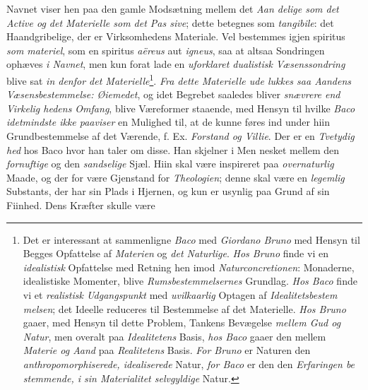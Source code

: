 Navnet viser hen paa den gamle Modsætning mellem det \emph{Aan\-%
delige som det Active og det Materielle som det Pas\-%
sive}; dette betegnes som \emph{tangibile}: det Haandgribelige, der
er Virksomhedens Materiale. Vel bestemmes igjen spiritus
\emph{som materiel}, som en spiritus \emph{aëreus} aut \emph{igneus}, saa at
altsaa Sondringen ophæves \emph{i Navnet}, men kun forat lade en
\emph{uforklaret dualistisk Væsenssondring} blive sat \emph{in\-%
denfor det Materielle}\footnote{Det er interessant at sammenligne \emph{Baco} med \emph{Giordano Bruno}
med Hensyn til Begges Opfattelse af \emph{Materien} og \emph{det Naturlige}.
\emph{Hos Bruno} finde vi en \emph{idealistisk} Opfattelse med Retning hen\-%
imod \emph{Naturconcretionen}: Monaderne, idealistiske Momenter, blive
\emph{Rumsbestemmelsernes} Grundlag. \emph{Hos Baco} finde vi et \emph{realistisk
Udgangspunkt} med \emph{uvilkaarlig} Optagen af \emph{Idealitetsbestem\-%
melsen}; det Ideelle reduceres til Bestemmelse af det Materielle.
\emph{Hos Bruno} gaaer, med Hensyn til dette Problem, Tankens Bevægelse
\emph{mellem Gud og Natur}, men overalt paa \emph{Idealitetens} Basis,
\emph{hos Baco} gaaer den mellem \emph{Materie og Aand} paa \emph{Realitetens}
Basis. \emph{For Bruno} er Naturen den \emph{anthropomorphiserede,
idealiserede} Natur, \emph{for Baco} er den den \emph{Erfaringen be\-%
stemmende, i sin Materialitet selvgyldige} Natur.}. \emph{Fra dette Materielle ude\-%
lukkes saa Aandens Væsensbestemmelse: Øiemedet},
og idet Begrebet saaledes bliver \emph{snævrere end Virkelig\-%
hedens Omfang}, blive Væreformer staaende, med Hensyn
til hvilke \emph{Baco idetmindste ikke paaviser} en Mulighed til,
at de kunne føres ind under hiin Grundbestemmelse af det
Værende, f. Ex. \emph{Forstand og Villie}. Der er en \emph{Tvetydig\-%
hed} hos Baco hvor han taler om disse. Han skjelner i Men\-%
nesket mellem den \emph{fornuftige} og den \emph{sandselige} Sjæl.
Hiin skal være inspireret paa \emph{overnaturlig} Maade, og der\-%
for være Gjenstand for \emph{Theologien}; denne skal være en
\emph{legemlig} Substants, der har sin Plads i Hjernen, og kun er
usynlig paa Grund af sin Fiinhed. Dens Kræfter skulle være
